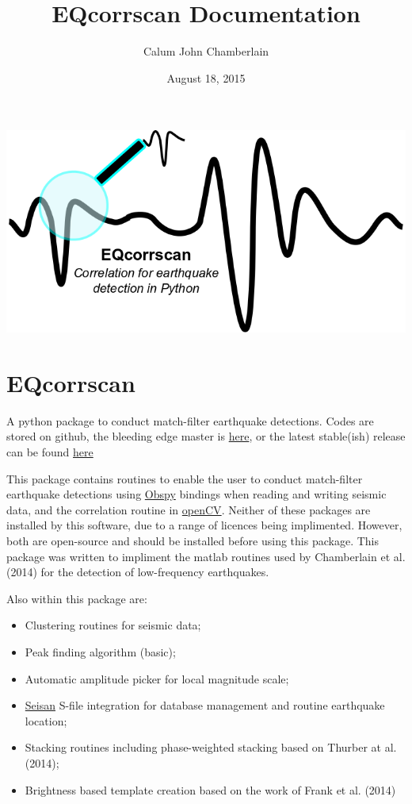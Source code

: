 \documentclass[a4paper,10pt,english]{sphinxmanual}
\title{EQcorrscan Documentation}
\date{August 18, 2015}
\author{Calum John Chamberlain}
\begin{document}
\maketitle
\tableofcontents
{}\label{index::doc}


{\includegraphics{EQcorrscan_logo.png}\hfill}


\chapter{EQcorrscan}
\label{index:eqcorrscan}\label{index:welcome-to-eqcorrscan-s-documentation}
A python package to conduct match-filter earthquake detections.  Codes are stored
on github, the bleeding edge master is \href{https://github.com/calum-chamberlain/EQcorrscan}{here}, or the latest stable(ish) release
can be found \href{https://github.com/calum-chamberlain/EQcorrscan/releases}{here}

This package contains routines to enable the user to conduct match-filter earthquake
detections using \href{https://github.com/obspy/obspy/wiki}{Obspy} bindings when reading
and writing seismic data, and the correlation routine in \href{http://opencv.org/}{openCV}.
Neither of these packages are installed by this software, due to a range of
licences being implimented.  However, both are open-source and should be installed
before using this package.  This package was written to impliment the matlab routines
used by Chamberlain et al. (2014) for the detection of low-frequency earthquakes.

Also within this package are:
\begin{itemize}
\item {} 
Clustering routines for seismic data;

\item {} 
Peak finding algorithm (basic);

\item {} 
Automatic amplitude picker for local magnitude scale;

\item {} 
\href{http://seisan.info/}{Seisan} S-file integration for database management and routine earthquake location;

\item {} 
Stacking routines including phase-weighted stacking based on Thurber at al. (2014);

\item {} 
Brightness based template creation based on the work of Frank et al. (2014)

\end{itemize}
\end{document}
